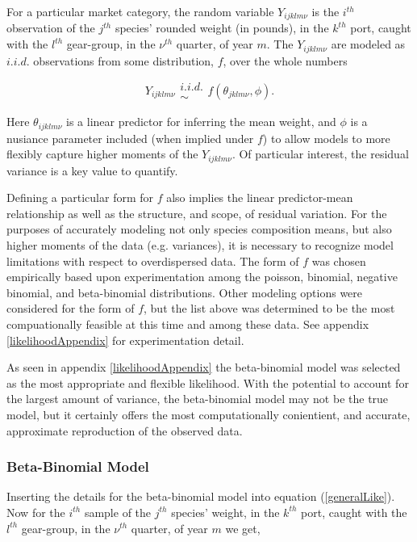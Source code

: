 \documentclass[12pt]{article}
\begin{document}
%
For a particular market category, the random variable \(Y_{ijklm\nu}\) is the 
\(i^{th}\) observation of the \(j^{th}\) species' rounded weight (in pounds), 
in the \(k^{th}\) port, caught with the \(l^{th}\) gear-group, in the \(\nu^{th}\) 
quarter, of year \(m\). The \(Y_{ijklm\nu}\) are modeled as $i.i.d.$ 
observations from some distribution, $f$, over the whole numbers

\begin{equation}
Y_{ijklm\nu} \substack{i.i.d.\\\sim} f(\theta_{jklm\nu}, \phi).
\label{generalLike}
\end{equation}

%
Here $\theta_{ijklm\nu}$ is a linear predictor for inferring the mean weight, 
and $\phi$ is a nusiance parameter included (when implied under $f$) to allow 
models to more flexibly capture higher moments of the \(Y_{ijklm\nu}\). Of 
particular interest, the residual variance is a key value to quantify.

%
Defining a particular form for $f$ also implies the linear predictor-mean 
relationship as well as the structure, and scope, of residual variation. For 
the purposes of accurately modeling not only species composition means, but 
also higher moments of the data (e.g. variances), it is necessary to recognize 
model limitations with respect to overdispersed data. The form of $f$ was 
chosen empirically based upon experimentation among the poisson, binomial, 
negative binomial, and beta-binomial distributions. Other modeling options 
were considered for the form of $f$, but the list above was determined to be 
the most compuationally feasible at this time and among these data. See 
appendix \ref{likelihoodAppendix} for experimentation detail. 

% 
As seen in appendix \ref{likelihoodAppendix} the beta-binomial model was 
selected as the most appropriate and flexible likelihood. With the potential 
to account for the largest amount of variance, the beta-binomial model may 
not be the true model, but it certainly offers the most computationally 
conientient, and accurate, approximate reproduction of the observed data. 

\subsubsection{Beta-Binomial Model}\label{bbModel}

%
Inserting the details for the beta-binomial model into equation 
(\ref{generalLike}). Now for the \(i^{th}\) sample of the \(j^{th}\) species' 
weight, in the \(k^{th}\) port, caught with the \(l^{th}\) gear-group, in the 
\(\nu^{th}\) quarter, of year \(m\) we get,
\end{document}
